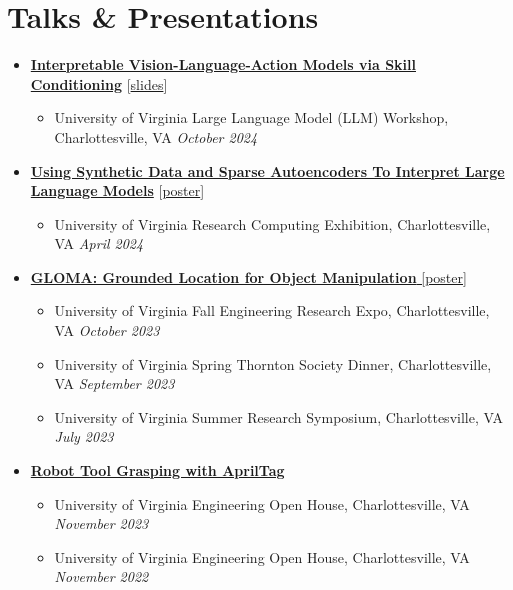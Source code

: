 \documentclass[letterpaper,11pt]{article}
\newcommand{\linkhref}[2]{\textcolor{linkblue}{\href{#1}{#2}}}
\newcommand{\Date}[1]{\textit{\small #1}}
\begin{document}
\section{Talks \& Presentations}
\begin{itemize}[label={}, leftmargin=0pt]
  \item {\href{https://www.brandonyifanyang.com/skillvla.pdf}{\textbf{Interpretable Vision-Language-Action Models via Skill Conditioning}} [\linkhref{https://www.brandonyifanyang.com/skillvla.pdf}{slides}]}
        \begin{itemize}
          \item University of Virginia Large Language Model (LLM) Workshop, Charlottesville, VA \hfill \Date{October 2024}
        \end{itemize}
  \item {\href{https://www.brandonyifanyang.com/MI.pdf}{\textbf{Using Synthetic Data and Sparse Autoencoders To Interpret Large Language Models}} [\linkhref{https://www.brandonyifanyang.com/MI.pdf}{poster}]}
        \begin{itemize}
          \item University of Virginia Research Computing Exhibition, Charlottesville, VA \hfill \Date{April 2024}
        \end{itemize}
  \item \href{https://www.brandonyifanyang.com/gloma.pdf}{\textbf{GLOMA: Grounded Location for Object Manipulation} [\linkhref{https://www.brandonyifanyang.com/gloma.pdf}{poster}]}
        \begin{itemize}
          \item University of Virginia Fall Engineering Research Expo, Charlottesville, VA \hfill \Date{October 2023}
          \item University of Virginia Spring Thornton Society Dinner, Charlottesville, VA \hfill \Date{September 2023}
          \item University of Virginia Summer Research Symposium, Charlottesville, VA \hfill \Date{July 2023}
        \end{itemize}
  \item \href{https://github.com/branyang02/apriltag_detection}{\textbf{Robot Tool Grasping with AprilTag}}
        \begin{itemize}
          \item University of Virginia Engineering Open House, Charlottesville, VA \hfill \Date{November 2023}
          \item University of Virginia Engineering Open House, Charlottesville, VA \hfill \Date{November 2022}
        \end{itemize}
\end{itemize}
\end{document}
